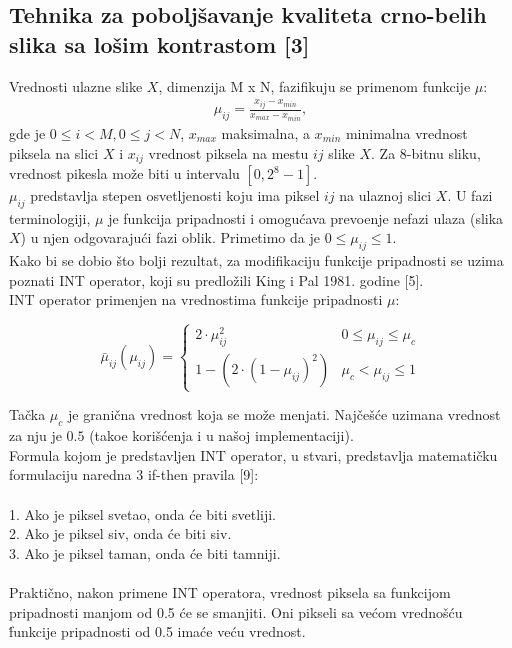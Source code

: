 \documentclass[12pt,a4paper]{article}
\theoremstyle{definition}
\theoremstyle{remark}
\theoremstyle{plain}
\begin{document}
\subsection{Tehnika za pobolj\v savanje kvaliteta crno-belih slika sa lo\v sim kontrastom [3]}

Vrednosti ulazne slike $X$, dimenzija M x N, fazifikuju se primenom funkcije $\mu$:\\
\begin{align*}
  \mu_{ij} = \frac{x_{ij} - x_{min}}{x_{max} - x_{min}}, 
\end{align*}
gde je $0\leq i < M, 0\leq j < N$, $x_{max}$ maksimalna, a $x_{min}$ minimalna vrednost piksela na slici $X$ i $x_{ij}$ vrednost piksela na mestu $ij$ slike $X$. Za 8-bitnu sliku, vrednost pikesla mo\v ze biti u intervalu $[0, 2^8 - 1]$. \\ 
$\mu_{ij}$ predstavlja stepen osvetljenosti koju ima piksel $ij$ na ulaznoj slici $X$. U fazi terminologiji, $\mu$ je funkcija pripadnosti i omogu\' cava prevo\dj enje nefazi ulaza (slika $X$) u njen odgovaraju\' ci fazi oblik. Primetimo da je $0\leq \mu_{ij} \leq 1$.\\

Kako bi se dobio \v sto bolji rezultat, za modifikaciju funkcije pripadnosti se uzima poznati INT operator, koji su predlo\v zili King i Pal 1981. godine [5].\\

INT operator primenjen na vrednostima funkcije pripadnosti $\mu$:

\begin{equation}\label{int_operator}
  \bar\mu_{ij}(\mu_{ij}) = 
    \begin{cases} 
      2 \cdot \mu_{ij}^2 & 0\leq \mu_{ij}\leq \mu_{c} \\
      1 - (2 \cdot (1 - \mu_{ij})^2) & \mu_{c} < \mu_{ij}\leq 1 
    \end{cases}
 \end{equation}

Ta\v cka $\mu_{c}$ je grani\v cna vrednost koja se mo\v ze menjati. Naj\v ce\v s\' ce uzimana vrednost za nju je $0.5$ 
(tako\dj e kori\v s\' cenja i u na\v soj implementaciji). \\

Formula kojom je predstavljen INT operator, u stvari, predstavlja matemati\v cku formulaciju
naredna 3 if-then pravila [9]: \\ \\
1. Ako je piksel svetao, onda \'ce biti svetliji.\\
2. Ako je piksel siv, onda \'ce biti siv. \\
3. Ako je piksel taman, onda \'ce biti tamniji.\\ \\
Prakti\v cno, nakon primene INT operatora, vrednost piksela sa funkcijom pripadnosti manjom od 0.5 \' ce se smanjiti. Oni pikseli sa ve\' com vredno\v s\' cu \' 
funkcije pripadnosti od 0.5 ima\' ce ve\' cu vrednost.
\\
\end{document}
